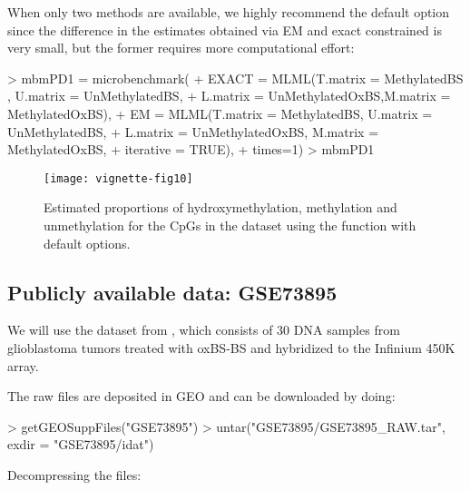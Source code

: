 \documentclass{article}
\begin{document}
When only two methods are available, we highly recommend the default option  since the difference in the estimates obtained via EM and exact constrained is very small, but the former requires more computational effort:

\begin{Schunk}
\begin{Sinput}
> mbmPD1 = microbenchmark(
+   EXACT = MLML(T.matrix = MethylatedBS , U.matrix = UnMethylatedBS,
+                L.matrix = UnMethylatedOxBS,M.matrix = MethylatedOxBS),
+   EM = MLML(T.matrix = MethylatedBS, U.matrix = UnMethylatedBS,
+             L.matrix = UnMethylatedOxBS, M.matrix = MethylatedOxBS,
+             iterative = TRUE),
+   times=1)
> mbmPD1
\end{Sinput}
\end{Schunk}




\begin{figure*}[h]
 \texttt{[image: vignette-fig10]}
 \caption{\label{fig:fig10} Estimated proportions of hydroxymethylation, methylation and unmethylation for the CpGs in the dataset using the  function with default options.}
\end{figure*}

\subsection{Publicly available data: GSE73895}

We will use the dataset from \cite{pmid27886174}, which consists of 30 DNA samples from glioblastoma tumors treated with oxBS-BS and hybridized to the Infinium 450K array.


The raw files are deposited in GEO and can be downloaded by doing:
\begin{Schunk}
\begin{Sinput}
> getGEOSuppFiles("GSE73895")
> untar("GSE73895/GSE73895_RAW.tar", exdir = "GSE73895/idat")
\end{Sinput}
\end{Schunk}

Decompressing the files:
\begin{Schunk}
\end{Schunk}
\end{document}
